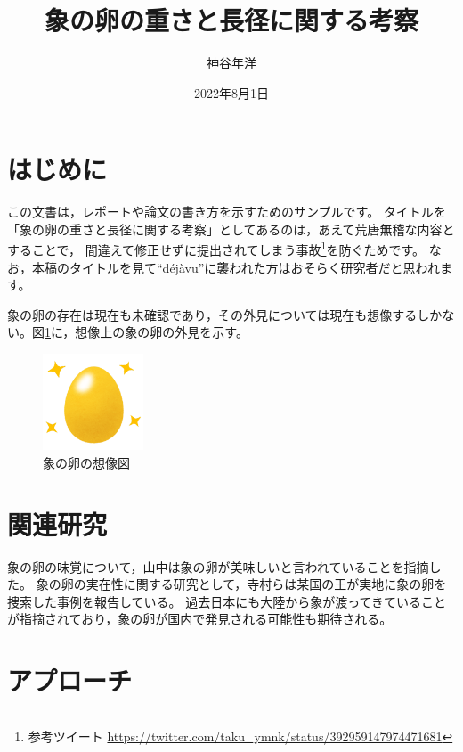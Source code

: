 \documentclass[dvipdfmx]{jsarticle}
\begin{document}
\title{象の卵の重さと長径に関する考察}
\author{神谷年洋}
\date{2022年8月1日}
\maketitle

\section{はじめに}

この文書は，レポートや論文の書き方を示すためのサンプルです。
タイトルを「象の卵の重さと長径に関する考察」としてあるのは，あえて荒唐無稽な内容とすることで，
間違えて修正せずに提出されてしまう事故\footnote{参考ツイート \url{https://twitter.com/taku_ymnk/status/392959147974471681}}を防ぐためです。 %
なお，本稿のタイトルを見て``d\'{e}j\`{a}vu''に襲われた方はおそらく研究者だと思われます。 %

象の卵の存在は現在も未確認であり，その外見については現在も想像するしかない。図\ref{fig:golden_egg}に，想像上の象の卵の外見を示す。 %

\begin{figure}[htp]
\centering
\includegraphics[width=3cm]{golden_egg.png}
\caption{象の卵の想像図}
\label{fig:golden_egg} %
\end{figure}

\section{関連研究}
\label{sec:related} %

象の卵の味覚について，山中\cite{kakenhi_latex}は象の卵が美味しいと言われていることを指摘した。 %
象の卵の実在性に関する研究として，寺村ら\cite{teramura2009}は某国の王が実地に象の卵を捜索した事例を報告している。
過去日本にも大陸から象が渡ってきていることが指摘\cite{kamei1990}されており，象の卵が国内で発見される可能性も期待される。

\section{アプローチ}
\end{document}
